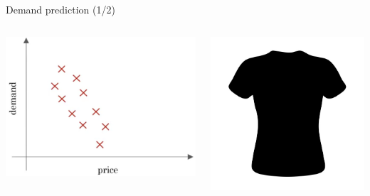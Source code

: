 \documentclass[pdf]{beamer}
\theoremstyle{mystyle}
\begin{document}
\begin{frame}{Demand prediction (1/2)}
	\begin{columns}[c]		
		\begin{column}{0.6\textwidth}
			\hspace{20pt}
			\includegraphics[scale=.225]{demand-prediction}
		\end{column}
		\hspace{-10pt}
		\begin{column}{0.4\textwidth}
			\includegraphics[scale=.225]{t-shirt}				
		\end{column}		
	\end{columns}	
\end{frame}
\end{document}
